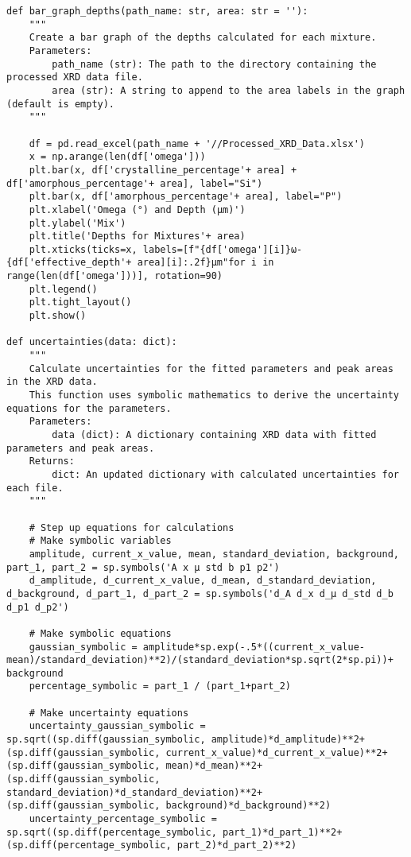 \begin{small}
\begin{verbatim}
def bar_graph_depths(path_name: str, area: str = ''):
    """
    Create a bar graph of the depths calculated for each mixture.
    Parameters:
        path_name (str): The path to the directory containing the processed XRD data file.
        area (str): A string to append to the area labels in the graph (default is empty).
    """

    df = pd.read_excel(path_name + '//Processed_XRD_Data.xlsx')
    x = np.arange(len(df['omega']))
    plt.bar(x, df['crystalline_percentage'+ area] + df['amorphous_percentage'+ area], label="Si")
    plt.bar(x, df['amorphous_percentage'+ area], label="P")
    plt.xlabel('Omega (°) and Depth (μm)')
    plt.ylabel('Mix')
    plt.title('Depths for Mixtures'+ area)
    plt.xticks(ticks=x, labels=[f"{df['omega'][i]}ω-{df['effective_depth'+ area][i]:.2f}μm"for i in range(len(df['omega']))], rotation=90)
    plt.legend()
    plt.tight_layout()
    plt.show()

def uncertainties(data: dict):
    """
    Calculate uncertainties for the fitted parameters and peak areas in the XRD data.
    This function uses symbolic mathematics to derive the uncertainty equations for the parameters.
    Parameters:
        data (dict): A dictionary containing XRD data with fitted parameters and peak areas.
    Returns:
        dict: An updated dictionary with calculated uncertainties for each file.
    """

    # Step up equations for calculations
    # Make symbolic variables
    amplitude, current_x_value, mean, standard_deviation, background, part_1, part_2 = sp.symbols('A x μ std b p1 p2')
    d_amplitude, d_current_x_value, d_mean, d_standard_deviation, d_background, d_part_1, d_part_2 = sp.symbols('d_A d_x d_μ d_std d_b d_p1 d_p2')
   
    # Make symbolic equations
    gaussian_symbolic = amplitude*sp.exp(-.5*((current_x_value-mean)/standard_deviation)**2)/(standard_deviation*sp.sqrt(2*sp.pi))+ background
    percentage_symbolic = part_1 / (part_1+part_2)

    # Make uncertainty equations
    uncertainty_gaussian_symbolic = sp.sqrt((sp.diff(gaussian_symbolic, amplitude)*d_amplitude)**2+(sp.diff(gaussian_symbolic, current_x_value)*d_current_x_value)**2+(sp.diff(gaussian_symbolic, mean)*d_mean)**2+(sp.diff(gaussian_symbolic, standard_deviation)*d_standard_deviation)**2+(sp.diff(gaussian_symbolic, background)*d_background)**2)
    uncertainty_percentage_symbolic = sp.sqrt((sp.diff(percentage_symbolic, part_1)*d_part_1)**2+(sp.diff(percentage_symbolic, part_2)*d_part_2)**2)


\end{verbatim}
\end{small}
